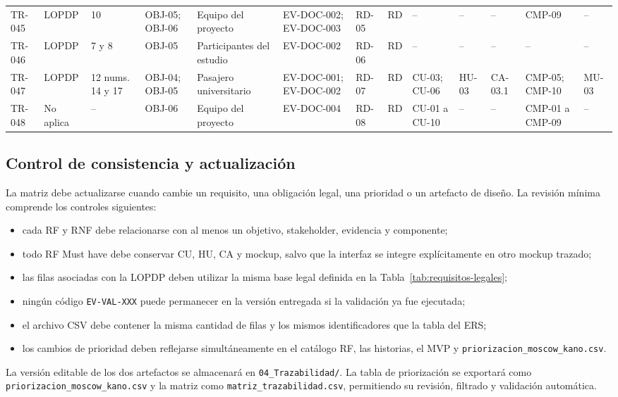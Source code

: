 \documentclass[12pt,a4paper]{article}
\begin{document}
\begin{landscape}
\begin{longtable}{C{0.75cm} L{1.05cm} L{1.10cm} L{1.45cm} L{1.60cm} L{2.00cm} C{0.95cm} C{0.75cm} L{1.35cm} L{1.15cm} L{1.55cm} L{1.75cm} L{1.25cm}}
TR-045 & LOPDP & 10 & OBJ-05; OBJ-06 & Equipo del proyecto & EV-DOC-002; EV-DOC-003 & RD-05 & RD & -- & -- & -- & CMP-09 & --\\
TR-046 & LOPDP & 7 y 8 & OBJ-05 & Participantes del estudio & EV-DOC-002 & RD-06 & RD & -- & -- & -- & -- & --\\
TR-047 & LOPDP & 12 nums. 14 y 17 & OBJ-04; OBJ-05 & Pasajero universitario & EV-DOC-001; EV-DOC-002 & RD-07 & RD & CU-03; CU-06 & HU-03 & CA-03.1 & CMP-05; CMP-10 & MU-03\\
TR-048 & No aplica & -- & OBJ-06 & Equipo del proyecto & EV-DOC-004 & RD-08 & RD & CU-01 a CU-10 & -- & -- & CMP-01 a CMP-09 & --\\
\end{longtable}
\endgroup
\end{landscape}

\subsection{Control de consistencia y actualización}

La matriz debe actualizarse cuando cambie un requisito, una obligación legal, una prioridad o un artefacto de diseño. La revisión mínima comprende los controles siguientes:

\begin{itemize}
  \item cada RF y RNF debe relacionarse con al menos un objetivo, stakeholder, evidencia y componente;
  \item todo RF Must have debe conservar CU, HU, CA y mockup, salvo que la interfaz se integre explícitamente en otro mockup trazado;
  \item las filas asociadas con la LOPDP deben utilizar la misma base legal definida en la Tabla~\ref{tab:requisitos-legales};
  \item ningún código \texttt{EV-VAL-XXX} puede permanecer en la versión entregada si la validación ya fue ejecutada;
  \item el archivo CSV debe contener la misma cantidad de filas y los mismos identificadores que la tabla del ERS;
  \item los cambios de prioridad deben reflejarse simultáneamente en el catálogo RF, las historias, el MVP y \texttt{priorizacion\_moscow\_kano.csv}.
\end{itemize}

La versión editable de los dos artefactos se almacenará en \texttt{04\_Trazabilidad/}. La tabla de priorización se exportará como \texttt{priorizacion\_moscow\_kano.csv} y la matriz como \texttt{matriz\_trazabilidad.csv}, permitiendo su revisión, filtrado y validación automática.
\end{document}
